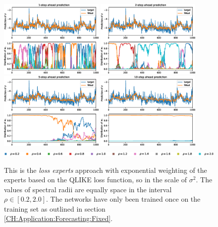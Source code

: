 \begin{figure}
    \begin{center}
        \includegraphics[width=0.45\textwidth]{Plots/Prediction/Experts_QLIKE_1step.eps}
        \includegraphics[width=0.45\textwidth]{Plots/Prediction/Experts_QLIKE_2step.eps} \\
        \includegraphics[width=0.45\textwidth]{Plots/Prediction/Experts_QLIKE_5step.eps}
        \includegraphics[width=0.45\textwidth]{Plots/Prediction/Experts_QLIKE_10step.eps} \\
        \includegraphics[width=1.0\textwidth]{Plots/Prediction/legend_experts.eps}
        \label{FIG:ExpertsQLIKE}
    \end{center}
    \caption{This is the \textit{loss experts} approach with exponential weighting of the experts based on the QLIKE loss function, so in the scale of $\sigma^2$. The values of spectral radii are equally space in the interval $\rho \in [0.2, 2.0]$. The networks have only been trained once on the training set as outlined in section \ref{CH:Application:Forecasting:Fixed}.}
\end{figure}


